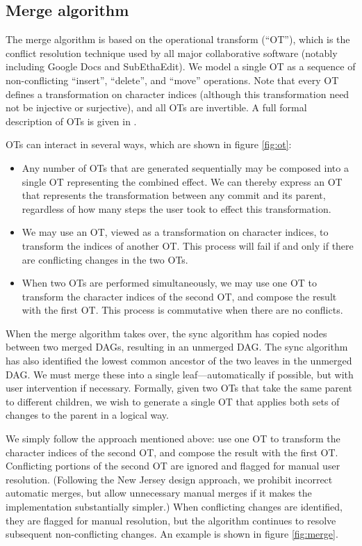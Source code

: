 \documentclass[11pt,titlepage]{article}
\begin{document}
\subsection{Merge algorithm}
\label{sec:merge}

The merge algorithm is based on the operational transform (``OT''),
which is the conflict resolution technique used by all major
collaborative software (notably including Google Docs and
SubEthaEdit).  We model a single OT as a sequence of non-conflicting
``insert'', ``delete'', and ``move'' operations.  Note that every OT
defines a transformation on character indices (although this
transformation need not be injective or surjective), and all OTs are
invertible.  A full formal description of OTs is given in \cite{wave}.

OTs can interact in several ways, which are shown in figure
\ref{fig:ot}:
\begin{itemize}
\item Any number of OTs that are generated sequentially may be
  composed into a single OT representing the combined effect.  We can
  thereby express an OT that represents the transformation between any
  commit and its parent, regardless of how many steps the user took to
  effect this transformation.
\item We may use an OT, viewed as a transformation on character
  indices, to transform the indices of another OT.  This process will
  fail if and only if there are conflicting changes in the two OTs.
\item When two OTs are performed simultaneously, we may use one OT to
  transform the character indices of the second OT, and compose the
  result with the first OT.  This process is commutative when there
  are no conflicts.
\end{itemize}

When the merge algorithm takes over, the sync algorithm has copied
nodes between two merged DAGs, resulting in an unmerged DAG.  The sync
algorithm has also identified the lowest common ancestor of the two
leaves in the unmerged DAG.  We must merge these into a single
leaf---automatically if possible, but with user intervention if
necessary. Formally, given two OTs that take the same parent to
different children, we wish to generate a single OT that applies both
sets of changes to the parent in a logical way.

We simply follow the approach mentioned above: use one OT to transform
the character indices of the second OT, and compose the result with
the first OT.  Conflicting portions of the second OT are ignored and
flagged for manual user resolution.  (Following the New Jersey design
approach, we prohibit incorrect automatic merges, but allow
unnecessary manual merges if it makes the implementation substantially
simpler.)  When conflicting changes are identified, they are flagged
for manual resolution, but the algorithm continues to resolve
subsequent non-conflicting changes.  An example is shown in figure
\ref{fig:merge}.
\end{document}
